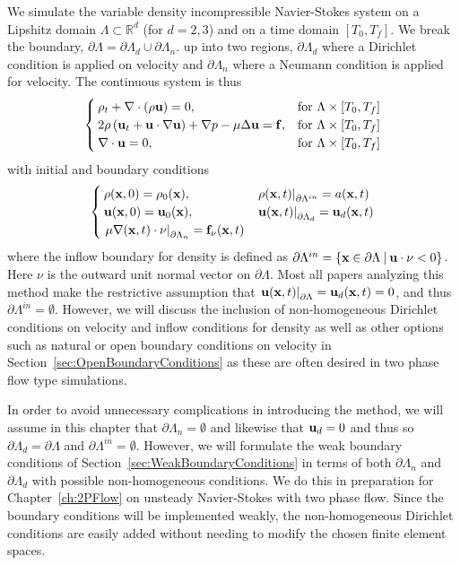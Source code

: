 \documentclass[letterpaper]{erdc}
\begin{document}
We simulate the variable density incompressible Navier-Stokes system on a
Lipshitz domain $\Lambda\subset \mathbb{R}^d$ (for $d=2,3$) and on a time
domain $[T_0,T_f]$.  We break the boundary,
$\partial\Lambda=\partial\Lambda_d\cup\partial\Lambda_n$. up into two regions,
$\partial\Lambda_d$ where a Dirichlet condition is applied on velocity and
$\partial\Lambda_n$ where a Neumann condition is applied for velocity.  The
continuous system is thus
\begin{equation}\label{eqn:variabledensityNavierStokes}
  \begin{cases}
    \rho_t + \nabla\cdot\left( \rho \textbf{u}\right) = 0, & \mbox{for }\Lambda\times[T_0,T_f]\\
2    \rho\left(\textbf{u}_t + \textbf{u}\cdot\nabla\textbf{u}  \right) + \nabla p - \mu\Delta \textbf{u} = \mathbf{f}, &\mbox{for }\Lambda\times[T_0,T_f]\\
    \nabla\cdot \textbf{u} = 0, &\mbox{for } \Lambda\times[T_0,T_f]
  \end{cases}
\end{equation}
with initial and boundary conditions
\begin{equation}\label{eqn:variabledensityNavierStokesBCIC}
  \begin{cases}
    \rho(\textbf{x},0) = \rho_0(\textbf{x}), & \left.\rho(\textbf{x},t)\right|_{\partial\Lambda^{in}} = a(\textbf{x},t)\\
    \textbf{u}(\textbf{x},0) = \textbf{u}_0(\textbf{x}), & \left.\textbf{u}(\textbf{x},t)\right|_{\partial\Lambda_d} = \textbf{u}_d(\textbf{x},t)\\
    \left.\mu\nabla(\textbf{x},t)\cdot\nu\right|_{\partial\Lambda_n} = \mathbf{f}_{\nu}(\textbf{x},t) 
  \end{cases}
\end{equation}
where the inflow boundary for density is defined as
$\partial\Lambda^{in} = \{ \textbf{x}\in \partial\Lambda \:|\: \textbf{u}\cdot\nu <0 \}$.
Here $\nu$ is the outward unit normal vector on $\partial\Lambda$.  Most all
papers analyzing this method make the restrictive assumption that
$\left.\textbf{u}(\textbf{x},t)\right|_{\partial\Lambda} = \textbf{u}_d(\textbf{x},t) = 0$, and thus
$\partial\Lambda^{in}= \emptyset$.  However, we will discuss the inclusion of
non-homogeneous Dirichlet conditions on velocity and inflow conditions for
density as well as other options such as natural or open boundary conditions on
velocity in Section~\ref{sec:OpenBoundaryConditions} as these are often desired
in two phase flow type simulations.


In order to avoid unnecessary complications in introducing the method, we will
assume in this chapter that $\partial\Lambda_n=\emptyset$ and likewise that
$\textbf{u}_d = 0$ and thus so $\partial\Lambda_d=\partial\Lambda$ and
$\partial\Lambda^{in}=\emptyset$.  However, we will formulate the weak boundary
conditions of Section~\ref{sec:WeakBoundaryConditions} in terms of both
$\partial\Lambda_n$ and $\partial\Lambda_d$ with possible non-homogeneous
conditions.  We do this in preparation for Chapter~\ref{ch:2PFlow} on unsteady
Navier-Stokes with two phase flow.  Since the boundary conditions will be
implemented weakly, the non-homogeneous Dirichlet conditions are easily added
without needing to modify the chosen finite element spaces.
\end{document}
